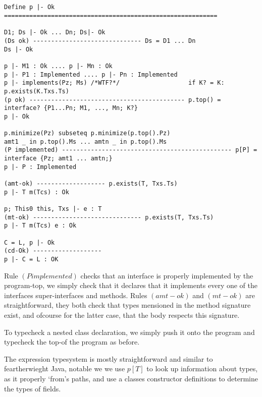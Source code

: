 \begin{verbatim}


Define p |- Ok
===========================================================

D1; Ds |- Ok ... Dn; Ds|- Ok
(Ds ok) ------------------------------ Ds = D1 ... Dn
Ds |- Ok

p |- M1 : Ok .... p |- Mn : Ok
p |- P1 : Implemented .... p |- Pn : Implemented
p |- implements(Pz; Ms) /*WTF?*/                   if K? = K: p.exists(K.Txs.Ts)
(p ok) ------------------------------------------- p.top() = interface? {P1...Pn; M1, ..., Mn; K?}
p |- Ok

p.minimize(Pz) subseteq p.minimize(p.top().Pz)
amt1 _ in p.top().Ms ... amtn _ in p.top().Ms
(P implemented) ----------------------------------------------- p[P] = interface {Pz; amt1 ... amtn;}
p |- P : Implemented

(amt-ok) ------------------- p.exists(T, Txs.Ts)
p |- T m(Tcs) : Ok

p; This0 this, Txs |- e : T
(mt-ok) ------------------------------ p.exists(T, Txs.Ts)
p |- T m(Tcs) e : Ok

C = L, p |- Ok
(cd-Ok) -------------------
p |- C = L : OK

\end{verbatim}

Rule $(P implemented)$ checks that an interface is properly implemented by the program-top, we simply check that it declares that it implements every one of the interfaces super-interfaces and methods.
Rules $(amt-ok)$ and $(mt-ok)$ are straightforward, they both check that types mensioned in the method signature exist, and ofcourse for the latter case, that the body respects this signature.

To typecheck a nested class declaration, we simply push it onto the program and typecheck the top-of the program as before.


The expression typesystem is mostly straightforward and similar to feartherwieght Java, notable we we use $p[T]$ to look up information about types, as it properly ‘from’s paths, and use a classes constructor definitions to determine the types of fields.

